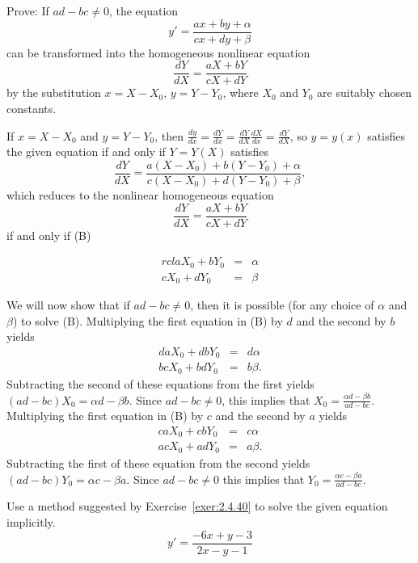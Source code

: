\documentclass{ximera}
\begin{document}
\begin{problem}\label{exer:2.4.40}
Prove:  If $ad-bc\neq 0$, the equation
$$
y'=\frac{ax+by+\alpha}{cx+dy+\beta}
$$
can be transformed into the homogeneous nonlinear equation
$$
\frac{dY}{dX}=\frac{aX+bY}{cX+dY}
$$
by the substitution $x=X-X_0,\,  y=Y-Y_0$,
where $X_0$ and $Y_0$ are suitably chosen constants.

\begin{solution}
    If $x=X-X_0$ and $y=Y-Y_0$, then $\frac{dy}{ dx}=\frac{dY}{
dx}=\frac{dY}{ dX}\frac{dX}{ dx}=\frac{dY}{ dX}$, so $y=y(x)$
satisfies the given equation if and only if $Y=Y(X)$ satisfies
 $$
\frac{dY}{ dX}=\frac{a(X-X_0)+b(Y-Y_0)+\alpha}{
c(X-X_0)+d(Y-Y_0)+\beta},
$$
 which reduces to the nonlinear homogeneous equation
$$
\frac{dY}{ dX}=\frac{aX+bY}{ cX+dY}
$$
 if and only if (B)

\begin{eqnarray*}{rcl}
aX_0+bY_0&=&\alpha\\
cX_0+dY_0&=&\beta
\end{eqnarray*}

We will now show that
if $ad-bc\neq 0$, then it is possible (for any choice of $\alpha$
and $\beta$) to solve (B).
Multiplying the first equation in (B) by $d$ and
 the second by  $b$ yields
\begin{eqnarray*}
daX_0+dbY_0&=&d\alpha  \\
bcX_0+bdY_0&=&b\beta.
\end{eqnarray*}
Subtracting the second of these equations from the first yields
 $(ad-bc)X_0=\alpha d-\beta b$.
Since $ad-bc\neq 0$, this implies that $X_0=\frac{\alpha d-\beta b}{
ad-bc}$. Multiplying the first equation in (B) by
$c$ and the second by $a$ yields
\begin{eqnarray*}
caX_0+cbY_0&=&c\alpha  \\
acX_0+adY_0&=&a\beta.
\end{eqnarray*}
Subtracting the first of these equation from the second yields
 $(ad-bc)Y_0=\alpha c-\beta a$. Since $ad-bc\ne0$ this implies that
$Y_0=\frac{\alpha c-\beta a}{ ad-bc}$.
\end{solution}
\end{problem}

\begin{problem}\label{exer:2.4.41} Use a method suggested by Exercise~\ref{exer:2.4.40} to solve the
given equation implicitly.
$$y'=\frac{-6x+y-3}{2x-y-1}$$
\end{problem}
\end{document}
